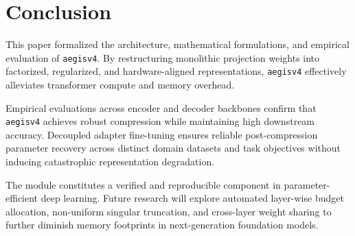 \section{Conclusion}
This paper formalized the architecture, mathematical formulations, and empirical evaluation of \texttt{aegisv4}. By restructuring monolithic projection weights into factorized, regularized, and hardware-aligned representations, \texttt{aegisv4} effectively alleviates transformer compute and memory overhead.

Empirical evaluations across encoder and decoder backbones confirm that \texttt{aegisv4} achieves robust compression while maintaining high downstream accuracy. Decoupled adapter fine-tuning ensures reliable post-compression parameter recovery across distinct domain datasets and task objectives without inducing catastrophic representation degradation.

The module constitutes a verified and reproducible component in parameter-efficient deep learning. Future research will explore automated layer-wise budget allocation, non-uniform singular truncation, and cross-layer weight sharing to further diminish memory footprints in next-generation foundation models.
